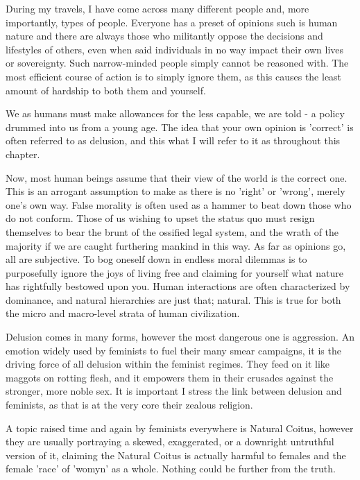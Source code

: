 During my travels, I have come across many different people and, more 
importantly, types of people. Everyone has a preset of opinions { such is human 
nature } and there are always those who militantly oppose the decisions and 
lifestyles of others, even when said individuals in no way impact their own 
lives or sovereignty. Such narrow-minded people simply cannot be reasoned with. 
The most efficient course of action is to simply ignore them, as this causes the 
least amount of hardship to both them and yourself.


We as humans must make allowances for the less capable, we are told - a policy 
drummed into us from a young age. The idea that your own opinion is 'correct' is 
often referred to as delusion, and this what I will refer to it as throughout 
this chapter.


Now, most human beings assume that their view of the world is the correct one. 
This is an arrogant assumption to make as there is no 'right' or 'wrong', merely 
one's own way. False morality is often used as a hammer to beat down those who 
do not conform. Those of us wishing to upset the status quo must resign 
themselves to bear the brunt of the ossified legal system, and the wrath of the 
majority if we are caught furthering mankind in this way. As far as opinions go, 
all are subjective. To bog oneself down in endless moral dilemmas is to 
purposefully ignore the joys of living free and claiming for yourself what 
nature has rightfully bestowed upon you. Human interactions are often 
characterized by dominance, and natural hierarchies are just that; natural. This 
is true for both the micro and macro-level strata of human civilization.


Delusion comes in many forms, however the most dangerous one is aggression. An 
emotion widely used by feminists to fuel their many smear campaigns, it is the 
driving force of all delusion within the feminist regimes. They feed on it like 
maggots on rotting flesh, and it empowers them in their crusades against the 
stronger, more noble sex. It is important I stress the link between delusion and 
feminists, as that is at the very core their zealous religion.


A topic raised time and again by feminists everywhere is Natural Coitus, however 
they are usually portraying a skewed, exaggerated, or a downright untruthful 
version of it, claiming the Natural Coitus is actually harmful to females and 
the female 'race' of 'womyn' as a whole. Nothing could be further from the 
truth.


